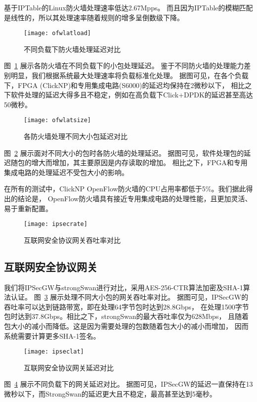 基于IPTable的Linux防火墙处理速率低达2.67Mpps。
而且因为IPTable的模糊匹配是线性的，所以其处理速率随着规则的增多呈倒数级下降。

\begin{figure}[htbp]
\centering
\texttt{[image: ofwlatload]}
\caption{不同负载下防火墙处理延迟对比} \label{fig:ofwlatload}
\end{figure}
图~\ref{fig:ofwlatload} 展示各防火墙在不同负载下的小包处理延迟。
鉴于不同防火墙的处理能力差别明显，我们根据系统最大处理速率将负载标准化处理。
据图可见，在各个负载下，FPGA (ClickNP)和专用集成电路(S6000)的延迟均保持在2微秒以下，
相比之下软件处理的延迟大得多且不稳定，例如在高负载下Click+DPDK的延迟甚至高达50微秒。

\begin{figure}[htbp]
\centering
\texttt{[image: ofwlatsize]}
\caption{各防火墙处理不同大小包延迟对比} \label{fig:ofwlatsize}
\end{figure}
图~\ref{fig:ofwlatsize} 展示面对不同大小的包时各防火墙的处理延迟。
据图可见，软件处理包的延迟随包的增大而增加，其主要原因是内存读取的增加。
相比之下，FPGA和专用集成电路的处理延迟不受包大小的影响。

在所有的测试中，ClickNP OpenFlow防火墙的CPU占用率都低于5\%。我们据此得出的结论是，
OpenFlow防火墙具有接近专用集成电路的处理性能，且更加灵活、易于重新配置。

\begin{figure}[htbp]
\centering
\texttt{[image: ipsecrate]}
\caption{互联网安全协议网关吞吐率对比} \label{fig:ipsecrate}
\end{figure}

\subsection{互联网安全协议网关}
我们将IPSecGW与strongSwan\cite{strongswan}进行对比，采用AES-256-CTR算法加密及SHA-1算法认证。
图~\ref{fig:ipsecrate} 展示处理不同大小包的网关吞吐率对比。
据图可见，IPSecGW的吞吐率可以达到链路带宽，即在处理64字节包时达到28.8Gbps，
在处理1500字节包时达到37.8Gbps。相比之下，strongSwan的最大吞吐率仅为628Mbps，
且随着包大小的减小而降低。这是因为需要处理的包数随着包大小的减小而增加，
因而系统需要计算更多SHA-1签名。

\begin{figure}[htbp]
\centering
\texttt{[image: ipseclat]}
\caption{互联网安全协议网关延迟对比} \label{fig:ipseclat}
\end{figure}
图~\ref{fig:ipseclat} 展示不同负载下的网关延迟对比。
据图可见，IPSecGW的延迟一直保持在13微秒以下，而StrongSwan的延迟更大且不稳定，最高甚至达到5毫秒。

